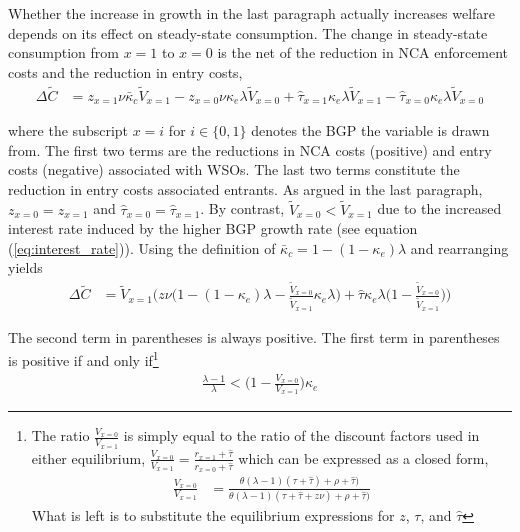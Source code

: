 Whether the increase in growth in the last paragraph actually increases welfare depends on its effect on steady-state consumption. The change in steady-state consumption from $x = 1$ to $x = 0$ is the net of the reduction in NCA enforcement costs and the reduction in entry costs,
\begin{align}
\Delta \tilde{C} &= z_{x = 1} \nu \bar{\kappa}_c  \tilde{V}_{x = 1} - z_{x = 0} \nu \kappa_e \lambda \tilde{V}_{x = 0} + \hat{\tau}_{x = 1} \kappa_e \lambda \tilde{V}_{x=1} - \hat{\tau}_{x = 0} \kappa_e \lambda \tilde{V}_{x =0}
\end{align}

where the subscript $x = i$ for $i \in \{0,1\}$ denotes the BGP the variable is drawn from. The first two terms are the reductions in NCA costs (positive) and entry costs (negative) associated with WSOs. The last two terms constitute the reduction in entry costs associated entrants. As argued in the last paragraph, $z_{x = 0} = z_{x=1}$ and $\hat{\tau}_{x = 0} = \hat{\tau}_{x = 1}$. By contrast, $\tilde{V}_{x=0} < \tilde{V}_{x=1}$ due to the increased interest rate induced by the higher BGP growth rate (see equation (\ref{eq:interest_rate})). Using the definition of $\bar{\kappa}_c = 1 - (1-\kappa_e) \lambda$ and rearranging yields
\begin{align}
\Delta \tilde{C} &= \tilde{V}_{x = 1} \Bigg( z \nu \Big( 1 - (1-\kappa_e)\lambda - \frac{\tilde{V}_{x = 0}}{\tilde{V}_{x = 1}}\kappa_e \lambda \Big) + \hat{\tau} \kappa_e \lambda \Big( 1 - \frac{\tilde{V}_{x = 0}}{\tilde{V}_{x = 1}}\Big) \Bigg) \label{eq:misallocation_NCA_consumption}
\end{align}

The second term in parentheses is always positive. The first term in parentheses is positive if and only if\footnote{The ratio $\frac{V_{x = 0}}{V_{x = 1}}$ is simply equal to the ratio of the discount factors used in either equilibrium, $\frac{V_{x = 0}}{V_{x = 1}} = \frac{r_{x = 1} + \hat{\tau}}{r_{x = 0} + \hat{\tau}}$ which can be expressed as a closed form,
	\begin{align*}
	\frac{V_{x = 0}}{V_{x = 1}} &= \frac{\theta(\lambda - 1) (\tau+ \hat{\tau}) + \rho + \hat{\tau})}{\theta(\lambda - 1) (\tau+ \hat{\tau} + z\nu )  + \rho + \hat{\tau})}
	\end{align*} 
	What is left is to substitute the equilibrium expressions for $z$, $\tau$, and $\hat{\tau}$}
\begin{align}
\frac{\lambda -1}{\lambda} < \big( 1 - \frac{V_{x = 0}}{V_{x = 1}} \big) \kappa_e  \label{cs:consumption_decreasing_condition}
\end{align}

